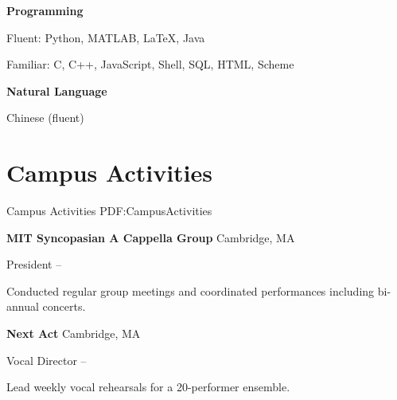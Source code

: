 \documentclass[a4paper,10pt,oneside]{article}
\begin{document}
\begin{body}
\textbf{Programming}
\par
Fluent: Python, MATLAB, {\LaTeX}, Java  \par
Familiar: C, C++, JavaScript, Shell, SQL, HTML, Scheme

\EntryGap

\textbf{Natural Language}
\par
Chinese (fluent)



\section
{Campus Activities}
{Campus Activities}
{PDF:CampusActivities}

\textbf{MIT Syncopasian A Cappella Group}
\hfill Cambridge, MA
\par
President
\hfill
{} --
\begin{detail}
Conducted regular group meetings and coordinated performances including bi-annual concerts. 
\end{detail}
\textbf{Next Act}
\hfill Cambridge, MA
\par
Vocal Director
\hfill
{} --
\begin{detail}
Lead weekly vocal rehearsals for a 20-performer ensemble.
\end{detail}




%




\end{body}
\end{document}
